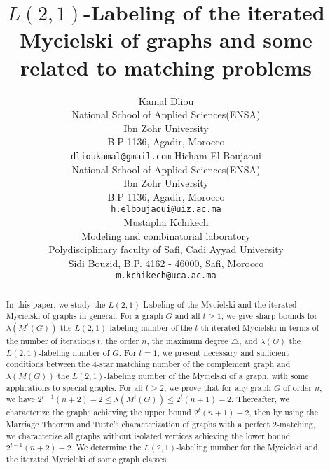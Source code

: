 \documentclass{article}
\title{$L(2,1)$-Labeling of the iterated Mycielski of graphs and some related to matching problems}
\author{
	Kamal Dliou \\
	National School of Applied Sciences(ENSA)\\
	Ibn Zohr University\\
	B.P 1136, Agadir, Morocco \\
	\texttt{dlioukamal@gmail.com}
		\And
		Hicham El Boujaoui \\
		National School of Applied Sciences(ENSA)\\
		Ibn Zohr University\\
		B.P 1136, Agadir, Morocco \\
		\texttt{h.elboujaoui@uiz.ac.ma} \\
	
	\And
		Mustapha Kchikech \\
		Modeling and combinatorial laboratory\\
		Polydisciplinary faculty of Safi, Cadi Ayyad University
\\
		Sidi Bouzid, B.P. 4162 - 46000, Safi, Morocco \\
		\texttt{m.kchikech@uca.ac.ma} \\

}
\newtheorem{open problem} {Open Problem}
\numberwithin{lemma}{section}
\numberwithin{theorem}{section}
\numberwithin{cor}{section}
\numberwithin{prop}{section}
\numberwithin{con}{section}
\numberwithin{claim}{section}
\numberwithin{obs}{section}
\numberwithin{dnt}{section}
\begin{document}
\maketitle






\begin{abstract}
In this paper, we study the $L(2, 1)$-Labeling of the Mycielski and the iterated Mycielski of graphs in general. For a graph $G$ and all $t\geq 1$, we give sharp bounds for $\lambda(M^t(G))$ the $L(2, 1)$-labeling number of the $t$-th iterated Mycielski in terms of the number of iterations $t$, the order $n$, the maximum degree $\bigtriangleup$, and $\lambda(G)$ the $L(2, 1)$-labeling number of $G$. For $t=1$, we present necessary and sufficient conditions between the $4$-star matching number of the complement graph and $\lambda(M(G))$ the $L(2, 1)$-labeling number of the Mycielski of a graph, with some applications to special graphs. For all $t\geq 2$, we prove that for any graph $G$ of order $n$, we have $2^{t-1}(n+2)-2\leq \lambda(M^t(G))\leq 2^{t}(n+1)-2$. Thereafter, we characterize the graphs achieving the upper bound $2^t(n+1)-2$, then by using the Marriage Theorem and Tutte's characterization of graphs with a perfect $2$-matching, we characterize all graphs without isolated vertices achieving the lower bound $2^{t-1}(n+2)-2$. We determine the $L(2, 1)$-labeling number for the Mycielski and the iterated Mycielski of some graph classes.
\end{abstract}


\end{document}
